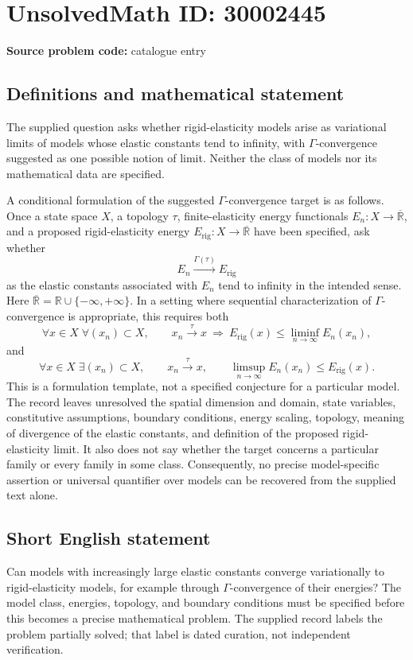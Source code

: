 \documentclass[11pt]{article}
\newcommand{\R}{\mathbb{R}}
\begin{document}
\section*{UnsolvedMath ID: 30002445}
\textbf{Source problem code:} catalogue entry
\subsection{Definitions and mathematical statement}
The supplied question asks whether rigid-elasticity models arise as variational limits of models whose elastic constants tend to infinity, with \(\Gamma\)-convergence suggested as one possible notion of limit. Neither the class of models nor its mathematical data are specified.

A conditional formulation of the suggested \(\Gamma\)-convergence target is as follows. Once a state space \(X\), a topology \(\tau\), finite-elasticity energy functionals \(E_n\colon X\to\overline{\R}\), and a proposed rigid-elasticity energy \(E_{\mathrm{rig}}\colon X\to\overline{\R}\) have been specified, ask whether
\[
E_n\xrightarrow{\Gamma(\tau)}E_{\mathrm{rig}}
\]
as the elastic constants associated with \(E_n\) tend to infinity in the intended sense. Here \(\overline{\R}=\R\cup\{-\infty,+\infty\}\). In a setting where sequential characterization of \(\Gamma\)-convergence is appropriate, this requires both
\[
\forall x\in X\;\forall (x_n)\subset X,\qquad
x_n\xrightarrow{\tau}x\ \Longrightarrow\ 
E_{\mathrm{rig}}(x)\leq\liminf_{n\to\infty}E_n(x_n),
\]
and
\[
\forall x\in X\;\exists (x_n)\subset X,\qquad
x_n\xrightarrow{\tau}x,
\qquad
\limsup_{n\to\infty}E_n(x_n)\leq E_{\mathrm{rig}}(x).
\]
This is a formulation template, not a specified conjecture for a particular model. The record leaves unresolved the spatial dimension and domain, state variables, constitutive assumptions, boundary conditions, energy scaling, topology, meaning of divergence of the elastic constants, and definition of the proposed rigid-elasticity limit. It also does not say whether the target concerns a particular family or every family in some class. Consequently, no precise model-specific assertion or universal quantifier over models can be recovered from the supplied text alone.
\subsection{Short English statement}
Can models with increasingly large elastic constants converge variationally to rigid-elasticity models, for example through \(\Gamma\)-convergence of their energies? The model class, energies, topology, and boundary conditions must be specified before this becomes a precise mathematical problem. The supplied record labels the problem partially solved; that label is dated curation, not independent verification.
\end{document}
